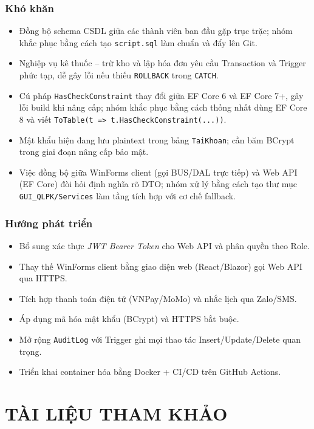 \documentclass[12pt,a4paper]{report}
\begin{document}
\subsection{Khó khăn}
\begin{itemize}[leftmargin=*]
\item Đồng bộ schema CSDL giữa các thành viên ban đầu gặp trục trặc; nhóm khắc phục bằng cách tạo \texttt{script.sql} làm chuẩn và đẩy lên Git.
\item Nghiệp vụ kê thuốc -- trừ kho và lập hóa đơn yêu cầu Transaction và Trigger phức tạp, dễ gây lỗi nếu thiếu \texttt{ROLLBACK} trong \texttt{CATCH}.
\item Cú pháp \texttt{HasCheckConstraint} thay đổi giữa EF Core 6 và EF Core 7+, gây lỗi build khi nâng cấp; nhóm khắc phục bằng cách thống nhất dùng EF Core 8 và viết \texttt{ToTable(t => t.HasCheckConstraint(...))}.
\item Mật khẩu hiện đang lưu plaintext trong bảng \texttt{TaiKhoan}; cần băm BCrypt trong giai đoạn nâng cấp bảo mật.
\item Việc đồng bộ giữa WinForms client (gọi BUS/DAL trực tiếp) và Web API (EF Core) đòi hỏi định nghĩa rõ DTO; nhóm xử lý bằng cách tạo thư mục \texttt{GUI\_QLPK/Services} làm tầng tích hợp với cơ chế fallback.
\end{itemize}

\subsection{Hướng phát triển}
\begin{itemize}[leftmargin=*]
\item Bổ sung xác thực \emph{JWT Bearer Token} cho Web API và phân quyền theo Role.
\item Thay thế WinForms client bằng giao diện web (React/Blazor) gọi Web API qua HTTPS.
\item Tích hợp thanh toán điện tử (VNPay/MoMo) và nhắc lịch qua Zalo/SMS.
\item Áp dụng mã hóa mật khẩu (BCrypt) và HTTPS bắt buộc.
\item Mở rộng \texttt{AuditLog} với Trigger ghi mọi thao tác Insert/Update/Delete quan trọng.
\item Triển khai container hóa bằng Docker + CI/CD trên GitHub Actions.
\end{itemize}

\chapter*{TÀI LIỆU THAM KHẢO}
\end{document}
